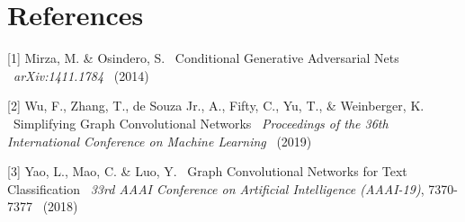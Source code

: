 \documentclass{article}
\begin{document}
\section*{References}
\medskip
\small

[1] Mirza, M. \& Osindero, S. \ Conditional Generative Adversarial Nets \ {\it arXiv:1411.1784} \ (2014)

[2] Wu, F., Zhang, T., de Souza Jr., A., Fifty, C., Yu, T., \& Weinberger, K. \ Simplifying Graph Convolutional Networks \ {\it Proceedings of the 36th International Conference on Machine Learning} \ (2019)

[3] Yao, L., Mao, C. \& Luo, Y. \ Graph Convolutional Networks for Text Classification \ {\it 33rd AAAI Conference on Artificial Intelligence (AAAI-19)}, 7370-7377 \ (2018)
\end{document}
